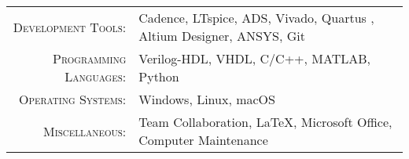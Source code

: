 %
%
%

\renewcommand{\arraystretch}{1.1}

	\begin{tabular}{>{}r>{}p{13cm}}
		\textsc{Development Tools:}	  			&   Cadence, LTspice, ADS, Vivado, Quartus \Rmnum{2}, Altium Designer, ANSYS, Git\\
		\textsc{Programming Languages:}  		&   Verilog-HDL, VHDL, C/C++, MATLAB, Python\\
		\textsc{Operating Systems:}	        &   Windows, Linux, macOS\\
    \textsc{Miscellaneous:}							&   Team Collaboration, \LaTeX, Microsoft Office, Computer Maintenance\\
	\end{tabular}
